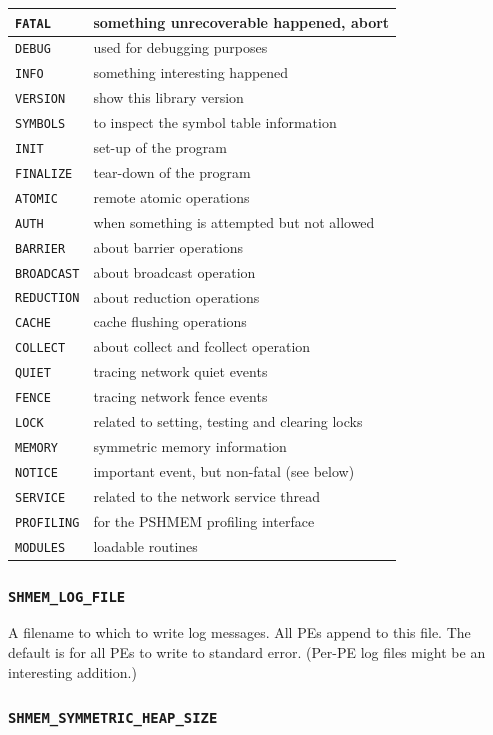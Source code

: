\documentclass[english]{article}
\providecommand{\tabularnewline}{\\}
\begin{document}
\begin{table}[h]
  \begin{tabular}{|l|l|}
    \hline
    \texttt{FATAL} & something unrecoverable happened, abort \tabularnewline
    \hline
    \hline
    \texttt{DEBUG} & used for debugging purposes \tabularnewline
    \hline
    \texttt{INFO} & something interesting happened \tabularnewline
    \hline
    \texttt{VERSION} & show this library version \tabularnewline
    \hline
    \texttt{SYMBOLS} & to inspect the symbol table information \tabularnewline
    \hline
    \hline
    \texttt{INIT} & set-up of the program \tabularnewline
    \hline
    \texttt{FINALIZE} & tear-down of the program \tabularnewline
    \hline
    \texttt{ATOMIC} & remote atomic operations \tabularnewline
    \hline
    \texttt{AUTH} & when something is attempted but not allowed \tabularnewline
    \hline
    \texttt{BARRIER} & about barrier operations \tabularnewline
    \hline
    \texttt{BROADCAST} & about broadcast operation \tabularnewline
    \hline
    \texttt{REDUCTION} & about reduction operations \tabularnewline
    \hline
    \texttt{CACHE} & cache flushing operations \tabularnewline
    \hline
    \texttt{COLLECT} & about collect and fcollect operation \tabularnewline
    \hline
    \texttt{QUIET} & tracing network quiet events \tabularnewline
    \hline
    \texttt{FENCE} & tracing network fence events \tabularnewline
    \hline
    \texttt{LOCK} & related to setting, testing and clearing locks \tabularnewline
    \hline
    \texttt{MEMORY} & symmetric memory information \tabularnewline
    \hline
    \texttt{NOTICE} & important event, but non-fatal (see below) \tabularnewline
    \hline
    \texttt{SERVICE} & related to the network service thread \tabularnewline
    \hline
    \texttt{PROFILING} & for the PSHMEM profiling interface \tabularnewline
    \hline
    \texttt{MODULES} & loadable routines \tabularnewline
    \hline
  \end{tabular}
\end{table}

\subsubsection*{\texttt{SHMEM\_LOG\_FILE}}

A filename to which to write log messages.  All PEs append to this
file. The default is for all PEs to write to standard error. (Per-PE
log files might be an interesting addition.)

\subsubsection*{\texttt{SHMEM\_SYMMETRIC\_HEAP\_SIZE}}
\end{document}
